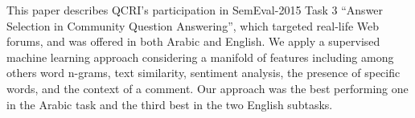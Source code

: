 This paper describes QCRI's participation in SemEval-2015 Task 3 ``Answer Selection in Community Question Answering'', which targeted real-life Web forums, and was offered in both Arabic and English. We apply a supervised machine learning approach considering a manifold of features including among others word n-grams, text similarity, sentiment analysis, the presence of specific words, and the context of a comment. Our approach was the best performing one in the Arabic task and the third best in the two English subtasks.
